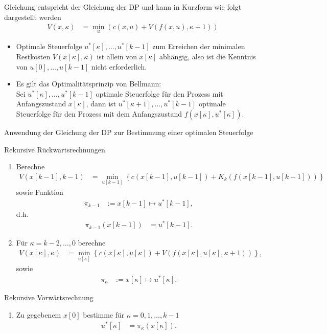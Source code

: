 Gleichung  entspricht der Gleichung der \ac{DP} und kann in Kurzform wie folgt dargestellt werden
\begin{align}
	V(x,\kappa) & = \min\limits_u\left(c(x,u)+V\left(f(x,u),\kappa +1 \right) \right)
\end{align}
\begin{remark}\hspace{1mm}
\begin{itemize}
  \item Optimale Steuerfolge $u^{\ast}[\kappa],\ldots,u^{\ast}[k-1]$ zum Erreichen der minimalen Restkosten $V\left(x[\kappa],\kappa \right)$ ist allein von $x[\kappa]$ abhängig, also
  ist die Kenntnis von $u[0],\ldots,u[k-1]$ nicht erforderlich.
  \item Es gilt das Optimalitätsprinzip von Bellmann:\\
  	Sei $u^{\ast}[\kappa],\ldots,u^{\ast}[k-1]$ optimale Steuerfolge für den Prozess mit Anfangszustand $x[\kappa]$, dann ist $u^{\ast}[\kappa+1],\ldots,u^{\ast}[k-1]$ optimale
  	Steuerfolge für den Prozess mit dem Anfangszustand $f\left(x[\kappa],u^{\ast}[\kappa] \right)$.
\end{itemize}
\end{remark}
Anwendung der Gleichung der \ac{DP} zur Bestimmung einer optimalen Steuerfolge

Rekursive Rückwärtsrechnungen
\begin{enumerate}[label=(S\arabic*)]
  \item Berechne
  \begin{align*}
  	V\left(x[k-1],k-1 \right) & = \min\limits_{u[k-1]}\left\{c(x[k-1],u[k-1]) + K_k\left(f(x[k-1],u[k-1]) \right) \right\}
  \end{align*}
  sowie Funktion
  \begin{align*}
  	\pi_{k-1} & := x[k-1]\mapsto u^{\ast}[k-1],
  \end{align*}
  d.h. 
  \begin{align*}
  	\pi_{k-1}\left(x[k-1] \right) & = u^{\ast}[k-1].
  \end{align*}
  \item Für $\kappa=k-2,\ldots,0$ berechne 
  \begin{align*}
  	V\left(x[\kappa],\kappa \right) & = \min\limits_{u[\kappa]}\left\{c\left(x[\kappa],u[\kappa] \right) + V\left(f(x[\kappa],u[\kappa],\kappa +1) \right) \right\},
  \end{align*}
  sowie
  \begin{align*}
  	\pi_{\kappa} & := x[\kappa]\mapsto u^{\ast}[\kappa].
  \end{align*}
\end{enumerate}
Rekursive Vorwärtsrechnung
\begin{enumerate}[label=(S\arabic*),resume] 
  \item Zu gegebenem $x[0]$ bestimme für $\kappa=0,1,\ldots,k-1$
  \begin{align*}
  	u^{\ast}[\kappa] & = \pi_{\kappa}(x[\kappa]).
  \end{align*}
\end {enumerate} 

